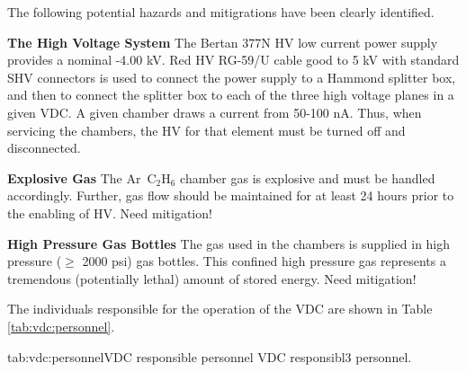 \begin{safetyen}{5}{5}
The following potential hazards and mitigrations have been clearly identified.
\begin{description}
\item {\bf The High Voltage System}
The Bertan 377N HV low current power supply provides a nominal
-4.00 kV.  Red HV RG-59/U cable good to 5 kV with standard SHV
connectors is used to connect the power supply to a Hammond splitter
box, and then to connect the splitter box to each of the three high
voltage planes in a given VDC.  A given chamber draws a current
from  50-100 nA.  Thus, when servicing the chambers, the HV for that
element must be turned off and disconnected.
\item{\bf Explosive Gas} The Ar~C$_2$H$_6$ chamber gas is explosive
and must be handled accordingly.  Further, gas flow should be maintained
for at least 24 hours prior to the enabling of HV. Need mitigation!
\item{\bf High Pressure Gas Bottles} The gas used in the chambers
is supplied in high pressure ($\ge$ 2000 psi) gas bottles. This
confined high pressure gas represents a tremendous (potentially lethal)
amount of stored energy.  Need mitigation!
\end{description}
\end{safetyen}

\begin{safetyen}{10}{15}
\end{safetyen}

The individuals responsible for the operation 
of the VDC are shown in Table \ref{tab:vdc:personnel}.

\begin{namestab}{tab:vdc:personnel}{VDC responsible personnel}{%
      VDC responsibl3 personnel.}
  \BogdanWojtsekhowski{}
\end{namestab}


